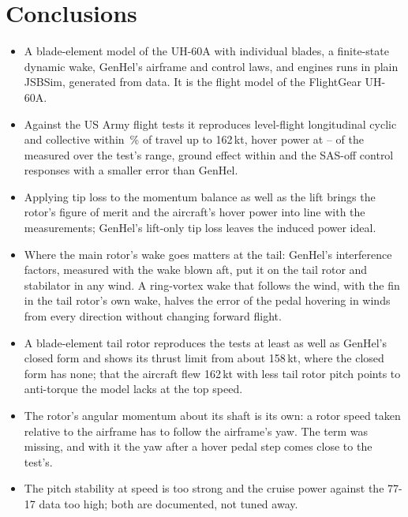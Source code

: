 \documentclass[10pt,a4paper,twocolumn]{article}
\begin{document}
\section{Conclusions}\label{sec:concl}
\begin{itemize}
\item A blade-element model of the UH-60A with individual blades, a finite-state dynamic wake, GenHel's airframe and control laws, and
engines runs in plain JSBSim, generated from data. It is the flight model of the FlightGear UH-60A.
\item Against the US Army flight tests it reproduces level-flight longitudinal cyclic and collective within \NBmaxlon\,\% of travel up to 162\,kt,
hover power at \NHmin--\NHmax{} of the measured over the test's range, ground effect within \NGEmax{} and the SAS-off control responses with a smaller error than GenHel.
\item Applying tip loss to the momentum balance as well as the lift brings the rotor's figure of merit and the aircraft's hover power into line with
the measurements; GenHel's lift-only tip loss leaves the induced power ideal.
\item Where the main rotor's wake goes matters at the tail: GenHel's interference factors, measured with the wake blown aft, put it on the
tail rotor and stabilator in any wind. A ring-vortex wake that follows the wind, with the fin in the tail rotor's own wake, halves the error
of the pedal hovering in winds from every direction without changing forward flight.
\item A blade-element tail rotor reproduces the tests at least as well as GenHel's closed form and shows its thrust limit from about 158\,kt,
where the closed form has none; that the aircraft flew 162\,kt with less tail rotor pitch points to anti-torque the model lacks at the top speed.
\item The rotor's angular momentum about its shaft is its own: a rotor speed taken relative to the airframe has to follow the airframe's yaw.
The term was missing, and with it the yaw after a hover pedal step comes close to the test's.
\item The pitch stability at speed is too strong and the cruise power against the 77-17 data too high; both are documented, not tuned away.
\end{itemize}
\end{document}
